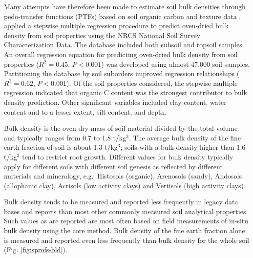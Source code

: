 \documentclass[graybox,natbib,nospthms,UStrade]{svmono}
\let\BeginKnitrBlock\begin \let\EndKnitrBlock\end
\let\BeginKnitrBlock\begin \let\EndKnitrBlock\end
\begin{document}
Many attempts have therefore been made to estimate soil bulk densities
through pedo-transfer functions (PTFs) based on soil organic carbon and
texture data
\citep{Curtis1964SSSAP, Adams1973JSS, Alexander1980SSSAJ, Federer1993CJFR, Rawls1983SS, Manrique1991SSSAJ, Bernoux1998SSSAJ}.
\citet{Heuscher2005SSSAJ} applied a stepwise multiple regression procedure to
predict oven-dried bulk density from soil properties using the NRCS
National Soil Survey Characterization Data. The database included both
subsoil and topsoil samples. An overall regression equation for
predicting oven-dried bulk density from soil properties (\(R^2=0.45\),
\(P<0.001\)) was developed using almost 47,000 soil samples. Partitioning
the database by soil suborders improved regression relationships
(\(R^2=0.62\), \(P<0.001\)). Of the soil properties considered, the stepwise
multiple regression indicated that organic C content was the strongest
contributor to bulk density prediction. Other significant variables
included clay content, water content and to a lesser extent, silt
content, and depth.

\BeginKnitrBlock{rmdnote}
Bulk density is the oven-dry mass of soil material divided by the total
volume and typically ranges from 0.7 to 1.8 t/kg\(^3\). The average bulk density of
the fine earth fraction of soil is about 1.3 t/kg\(^3\); soils with a bulk density higher
than 1.6 t/kg\(^3\) tend to restrict root growth. Different values for bulk density
typically apply for different soils with different soil genesis as
reflected by different materials and mineralogy, e.g.~Histosols
(organic), Arenosols (sandy), Andosols (allophanic clay), Acrisols (low
activity clays) and Vertisols (high activity clays).
\EndKnitrBlock{rmdnote}

Bulk density tends to be measured and reported less frequently in legacy
data bases and reports than most other commonly measured soil analytical
properties. Such values as are reported are most often based on field
measurements of in-situ bulk density using the core method. Bulk density
of the fine earth fraction alone is measured and reported even less
frequently than bulk density for the whole soil
(Fig. \ref{fig:sprofs-bld}).
\end{document}
